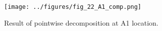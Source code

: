 \documentclass[12pt]{article}
\begin{document}
\begin{figure}
	\centering
	\texttt{[image: ../figures/fig\_22\_A1\_comp.png]}
	\caption{Result of pointwise decomposition at A1 location. }
	\label{C3.fig:dcmp_A1}
\end{figure}


%




\end{document}
